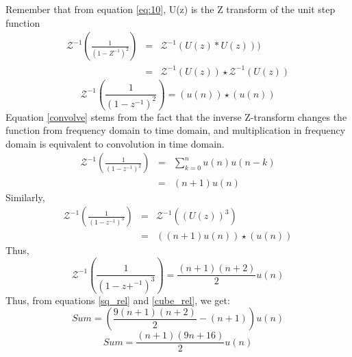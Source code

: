 \documentclass[journal,12pt,twocolumn]{IEEEtran}
\theoremstyle{remark}
\begin{document}
Remember that from equation \ref{eq:10}, U(z) is the Z transform of the unit step function\\
\begin{eqnarray}
    \mathcal{Z}^{-1}(\frac{1}{(1-Z^{-1})^{2}}) &=& \mathcal{Z}^{-1}(U(z)*U(z)))\\
    \label{eq:16}&=&\mathcal{Z}^{-1}(U(z)) \star \mathcal{Z}^{-1}(U(z))
\end{eqnarray}
\bigskip
\begin{equation}\label{convolve}
    \mathcal{Z}^{-1}({\frac{1}{(1-z^{-1})^2}}) = (u(n)) \star (u(n))
\end{equation}
Equation \ref{convolve} stems from the fact that the inverse Z-transform changes the function from frequency domain to time domain, and multiplication in frequency domain is equivalent to convolution in time domain.
\begin{eqnarray}
    \mathcal{Z}^{-1}(\frac{1}{(1-z^{-1
    })^2})&=&\sum_{k=0}^{n} u(n)u(n-k)\\
    \label{sq_rel}&=&(n+1)u(n)
\end{eqnarray}
Similarly,
\begin{eqnarray}
    \mathcal{Z}^{-1}(\frac{1}{(1-z^{-1})^3})&=&\mathcal{Z}^{-1}((U(z))^3)\\
    &=&((n+1)u(n))\star(u(n))
\end{eqnarray}
Thus,
\begin{equation}\label{cube_rel}
    \mathcal{Z}^{-1}(\frac{1}{(1-z+^{-1})^3}) = \frac{(n+1)(n+2)}{2}u(n)
\end{equation}
Thus, from equations \ref{sq_rel} and \ref{cube_rel}, we get:
$$Sum = (\frac{9(n+1)(n+2)}{2} - (n+1))u(n)$$
$$Sum = \frac{(n+1)(9n+16)}{2} u(n)$$
\end{document}
